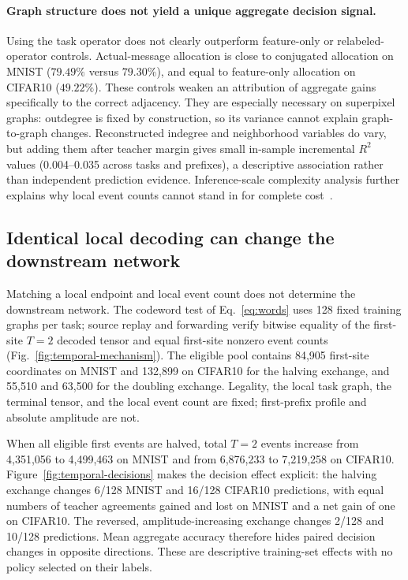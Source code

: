 \documentclass[10pt,twocolumn,letterpaper]{article}
\begin{document}
\paragraph{Graph structure does not yield a unique aggregate decision signal.}
Using the task operator does not clearly outperform feature-only or relabeled-operator controls. Actual-message allocation is close to conjugated allocation on MNIST ($79.49\%$ versus $79.30\%$), and equal to feature-only allocation on CIFAR10 ($49.22\%$). These controls weaken an attribution of aggregate gains specifically to the correct adjacency. They are especially necessary on superpixel graphs: outdegree is fixed by construction, so its variance cannot explain graph-to-graph changes. Reconstructed indegree and neighborhood variables do vary, but adding them after teacher margin gives small in-sample incremental $R^2$ values (0.004--0.035 across tasks and prefixes), a descriptive association rather than independent prediction evidence. Inference-scale complexity analysis further explains why local event counts cannot stand in for complete cost~\cite{bu2025complexity}.

\subsection{Identical local decoding can change the downstream network}
Matching a local endpoint and local event count does not determine the downstream network. The codeword test of Eq.~\eqref{eq:words} uses 128 fixed training graphs per task; source replay and forwarding verify bitwise equality of the first-site $T=2$ decoded tensor and equal first-site nonzero event counts (Fig.~\ref{fig:temporal-mechanism}). The eligible pool contains 84,905 first-site coordinates on MNIST and 132,899 on CIFAR10 for the halving exchange, and 55,510 and 63,500 for the doubling exchange. Legality, the local task graph, the terminal tensor, and the local event count are fixed; first-prefix profile and absolute amplitude are not.

When all eligible first events are halved, total $T=2$ events increase from 4,351,056 to 4,499,463 on MNIST and from 6,876,233 to 7,219,258 on CIFAR10. Figure~\ref{fig:temporal-decisions} makes the decision effect explicit: the halving exchange changes 6/128 MNIST and 16/128 CIFAR10 predictions, with equal numbers of teacher agreements gained and lost on MNIST and a net gain of one on CIFAR10. The reversed, amplitude-increasing exchange changes 2/128 and 10/128 predictions. Mean aggregate accuracy therefore hides paired decision changes in opposite directions. These are descriptive training-set effects with no policy selected on their labels.
\end{document}
